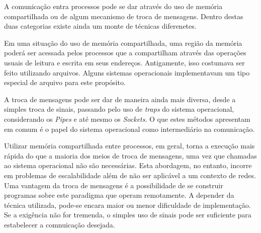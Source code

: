 \quest*{}%

\begin{answer}
    A comunicação entra processos pode se dar através do uso de memória compartilhada ou de algum mecanismo de troca de mensagens. Dentro destas duas categorias existe ainda um monte de técnicas diferenetes.
    
    Em uma situação do uso de memória compartilhada, uma região da memória poderá ser acessada pelos processos que a compartilham através das operações usuais de leitura e escrita em seus endereços. Antigamente, isso costumava ser feito utilizando arquivos. Alguns sistemas operacionais implementavam um tipo especial de arquivo para este propósito.

    A troca de mensagens pode ser dar de maneira ainda mais diversa, desde a simples troca de sinais, passando pelo uso de \textit{traps} do sistema operacional, considerando os \textit{Pipes} e até mesmo os \textit{Sockets}. O que estes métodos apresentam em comum é o papel do sistema operacional como intermediário na comunicação.

    Utilizar memória compartilhada entre processos, em geral, torna a execução mais rápida do que a maioria dos meios de troca de mensagens, uma vez que chamadas ao sistema operacional não são necessárias. Esta abordagem, no entanto, incorre em problemas de escalabilidade além de não ser aplicável a um contexto de redes. Uma vantagem da troca de mensagens é a possibilidade de se construir programas sobre este paradigma que operam remotamente. A depender da técnica utilizada, pode-se encara maior ou menor dificuldade de implementação. Se a exigência não for tremenda, o simples uso de sinais pode ser suficiente para estabelecer a comnuicação desejada.

\end{answer}

\quest*{}%

